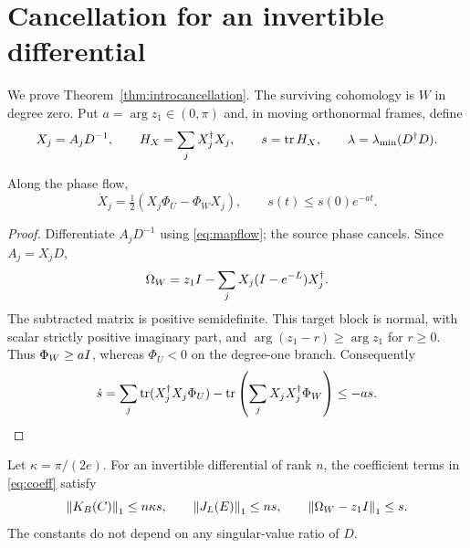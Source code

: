 \section{Cancellation for an invertible differential}\label{sec:invertible}

We prove Theorem~\ref{thm:introcancellation}. The surviving cohomology
is $W$ in degree zero. Put $a=\arg z_1\in(0,\pi)$ and, in moving
orthonormal frames, define
\begin{equation}\label{eq:invertiblevariables}
 X_j=A_jD^{-1},\qquad H_X=\sum_jX_j^\dagger X_j,\qquad
 s=\operatorname{tr} H_X,\qquad \lambda=\lambda_{\min}(D^\dagger D).
\end{equation}

\begin{lemma}\label{lem:Xcontract}
Along the phase flow,
\begin{equation}\label{eq:Xcontract}
 \dot X_j=\tfrac12(X_j\Phi_U-\Phi_WX_j),\qquad
 s(t)\leq s(0)e^{-at}.
\end{equation}
\end{lemma}

\begin{proof}
Differentiate $A_jD^{-1}$ using \eqref{eq:mapflow}; the source phase
cancels. Since $A_j=X_jD$,
\begin{equation}\label{eq:targetX}
 \Omega_W=z_1I-\sum_jX_j(I-e^{-L})X_j^\dagger .
\end{equation}
The subtracted matrix is positive semidefinite. This target block
is normal, with scalar strictly positive imaginary part, and
$\arg(z_1-r)\geq\arg z_1$ for $r\geq0$. Thus $\Phi_W\geq aI$,
whereas $\Phi_U<0$ on the degree-one branch. Consequently
\[
 \dot s=\sum_j\operatorname{tr}(X_j^\dagger X_j\Phi_U)
          -\operatorname{tr}\left(\sum_jX_jX_j^\dagger\Phi_W\right)
 \leq-as.\qedhere
\]
\end{proof}

\begin{lemma}\label{lem:heatbounds}
Let $\kappa=\pi/(2e)$. For an invertible differential of rank $n$,
the coefficient terms in \eqref{eq:coeff} satisfy
\begin{equation}\label{eq:heatbounds}
 \left\lVert K_B(C)\right\rVert_1\leq n\kappa s,\qquad
 \left\lVert J_L(E)\right\rVert_1\leq ns,\qquad
 \left\lVert\Omega_W-z_1I\right\rVert_1\leq s.
\end{equation}
The constants do not depend on any singular-value ratio of $D$.
\end{lemma}

